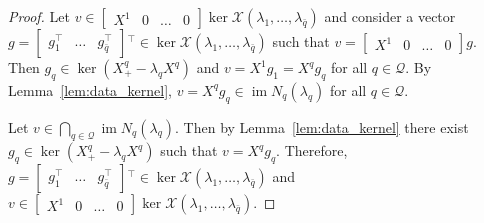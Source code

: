 \documentclass[10pt,a4paper]{amsart}
\begin{document}
\begin{proof}
    Let $v\in \begin{bmatrix}
        X^1 & 0 &\dots & 0
    \end{bmatrix} \ker \mathcal X(\lambda_1,\dots, \lambda_{\bar q})$ and consider a vector $g = \begin{bmatrix}
        g_{1}^\top & \dots & g_{\bar q}^\top
    \end{bmatrix}{}^\top\in \ker \mathcal X(\lambda_1,\dots, \lambda_{\bar q})$ such that $v = \begin{bmatrix}
        X^1 & 0 &\dots & 0
    \end{bmatrix} g$. Then $g_q\in \ker(X_+^q-\lambda_q X^q)$ and $v = X^1 g_1 = X^q g_q$ for all $q\in\mathcal Q$. By Lemma~\ref{lem:data_kernel}, $v = X^q g_q \in \operatorname{im} N_q(\lambda_q)$ for all $q\in\mathcal Q$.

    Let $v\in \bigcap_{q\in\mathcal Q} \operatorname{im}N_q(\lambda_q)$. Then by Lemma~\ref{lem:data_kernel} there exist $g_q\in \ker(X_+^q-\lambda_q X^q)$ such that $v = X^q g_q$. Therefore, $g = \begin{bmatrix}
        g_{1}^\top & \dots & g_{\bar q}^\top
    \end{bmatrix}{}^\top\in \ker \mathcal X(\lambda_1,\dots, \lambda_{\bar q})$ and $v\in \begin{bmatrix}
        X^1 & 0 &\dots & 0
    \end{bmatrix} \ker \mathcal X(\lambda_1,\dots, \lambda_{\bar q})$.
\end{proof}
\end{document}
